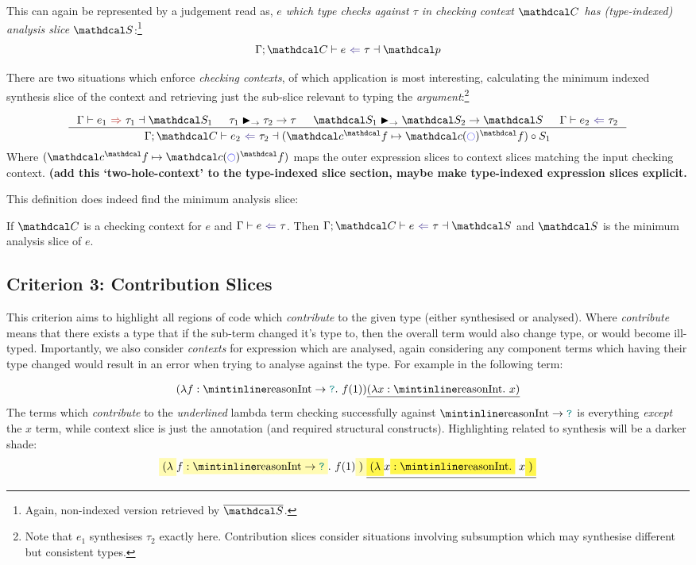 This can again be represented by a judgement read as, \textit{$e$ which type checks against $\tau$ in checking context $\C$ has (type-indexed) analysis slice $\S$}:\footnote{Again, non-indexed version retrieved by $\overline{\S}$.}
\[\analysisslice{\C}{e}{\tau}{\p}\]

There are two situations which enforce \textit{checking contexts}, of which application is most interesting, calculating the minimum indexed synthesis slice of the context and retrieving just the sub-slice relevant to typing the \textit{argument}:\footnote{Note that $e_1$ synthesises $\tau_2$ exactly here. Contribution slices consider situations involving subsumption which may synthesise different but consistent types.}

\[\inference{\synthesisslice{e_1}{\tau_1}{\S_1} & \tau_1 \funmatch \tau_2 \to \tau & \S_1 \funmatch \S_2 \to \S & \analysis{e_2}{\tau_2}}{\analysisslice{\C}{e_2}{\tau_2}{(\Cs^\f \mapsto \Cs(\cmark)^\f) \circ S_1}}\]
Where $(\Cs^\f \mapsto \Cs(\cmark)^\f)$ maps the outer expression slices to context slices matching the input checking context. \textbf{(add this `two-hole-context' to the type-indexed slice section, maybe make type-indexed expression slices explicit.} 

This definition does indeed find the minimum analysis slice:
\begin{conjecture}[Correctness]\label{conj:AnalysisSliceCorrectness}
If $\C$ is a checking context for $e$ and $\analysis{e}{\tau}$. Then $\analysisslice{\C}{e}{\tau}{\S}$ and $\S$ is the minimum analysis slice of $e$.
\end{conjecture}

\subsection{Criterion 3: Contribution Slices}
\label{sec:ContributionSlices}
This criterion aims to highlight all regions of code which \textit{contribute} to the given type (either synthesised or analysed). Where \textit{contribute} means that there exists a type that if the sub-term changed it's type to, then the overall term would also change type, or would become ill-typed. Importantly, we also consider \textit{contexts} for expression which are analysed, again considering any component terms which having their type changed would result in an error when trying to analyse against the type. For example in the following term:

\[(\lambda f: \code{Int} \to \dyn.\ f(1))\underline{(\lambda x : \code{Int}.\ x)}\]
The terms which \textit{contribute} to the \textit{underlined} lambda term checking successfully against $\code{Int} \to \dyn$ is everything \textit{except} the $x$ term, while context slice is just the annotation (and required structural constructs). Highlighting related to synthesis will be a darker shade:
\[\hlcmaths[yellow!30]{(\lambda} f\hlcmaths[yellow!30]{: \code{Int} \to \dyn}.\ f(1)\hlcmaths[yellow!30]{)}\underline{\hlcmaths[yellow!70]{(\lambda} x \hlcmaths[yellow!70]{: \code{Int}.}\ x\hlcmaths[yellow!70]{)}}\]

